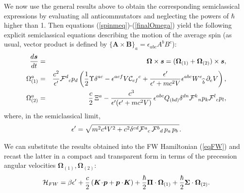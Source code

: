 \documentclass[preprint,showpacs,preprintnumbers,eqsecnum,amsmath,amssymb]{revtex4-1}
\begin{document}
We now use the general results above to obtain the corresponding semiclassical
expressions by evaluating all anticommutators and neglecting the powers of $\hbar$
higher than 1. Then equations (\ref{spinmeq})-(\ref{finalOmega}) yield the
following explicit semiclassical equations describing the motion of the average spin 
(as usual, vector product is defined by $\{\bm A\times\bm B\}_a=\epsilon_{abc}A^bB^c$):
\begin{eqnarray}
{\frac {d{\bm s}}{dt}} &=& \bm \Omega\times{\bm s}
= (\bm \Omega_{(1)}+\bm \Omega_{(2)})\times{\bm s},\label{ds}\\
\Omega^a_{(1)} &=& {\frac {c^2}{\epsilon'}}{\cal F}^d{}_c p_d\left({\frac 12}
{\Upsilon}\delta^{ac} - \epsilon^{aef}V{\cal C}_{ef}{}^c + {\frac {\epsilon'}
{\epsilon' + mc^2V}}\epsilon^{abc}W^e{}_{\widehat{b}}\,\partial_eV\right),
\label{FO}\\
\Omega^a_{(2)} &=& {\frac c2}\,\Xi^a - {\frac {c^3}{\epsilon'(\epsilon'+mc^2V)}}
\,\epsilon^{abc}Q_{(bd)}\delta^{dn}{\cal F}^k{}_np_k{\cal F}^l{}_cp_l,
\label{finalOmegase}
\end{eqnarray}
where, in the semiclassical limit,
\begin{equation}
\epsilon' = \sqrt{m^2c^4V^2 + c^2\delta^{cd}{\cal F}^a{}_c\,{\cal F}^b{}_d
\,p_a\,p_b\,}.\label{eQ}
\end{equation}

We can substitute the results obtained into the FW Hamiltonian (\ref{eqFW})
and recast the latter in a compact and transparent form in terms of the
precession angular velocities $\bm\Omega_{(1)},\bm\Omega_{(2)}$:
\begin{eqnarray}
{\cal H}_{FW} = \beta\epsilon'+\frac c2\left(\bm K\!\cdot\!\bm p
+ \bm p\cdot\!\bm K\right) +\frac\hbar2\bm\Pi\cdot\bm\Omega_{(1)}+
\frac\hbar2\bm\Sigma\cdot\bm\Omega_{(2)}.\label{Hamlt}
\end{eqnarray}
\end{document}
